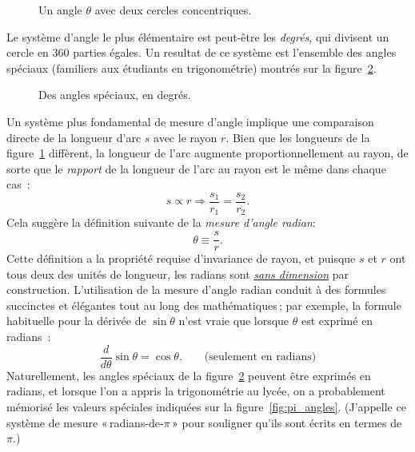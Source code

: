 \begin{figure}
\begin{center}
\end{center}
\caption{Un angle $\theta$ avec deux cercles
concentriques.\label{fig:angle_arclength}}
\end{figure}

Le système d'angle le plus élémentaire est peut-être les \emph{degrés}, qui
divisent un cercle en 360 parties égales. Un resultat de ce système est
l'ensemble des angles spéciaux (familiers aux étudiants en trigonométrie)
montrés sur la figure~\ref{fig:degree_angles}.

\begin{figure}
\begin{center}
\end{center}
\caption{Des angles spéciaux, en degrés.\label{fig:degree_angles}}
\end{figure}

Un système plus fondamental de mesure d'angle implique une comparaison directe
de la longueur d'arc $s$ avec le rayon $r$. Bien que les longueurs de la
figure~\ref{fig:angle_arclength} diffèrent, la longueur de l'arc augmente
proportionnellement au rayon, de sorte que le \emph{rapport} de la longueur de
l'arc au rayon est le même dans chaque cas~:
\[
s\propto r \Rightarrow \frac{s_1}{r_1} = \frac{s_2}{r_2}.
\]
Cela suggère la définition suivante de la \emph{mesure d'angle radian}:
\begin{equation}
\label{eq:radians}
\theta \equiv \frac{s}{r}.
\end{equation}
Cette définition a la propriété requise d'invariance de rayon, et puisque $s$ et
$r$ ont tous deux des unités de longueur, les radians sont
\href{https://fr.wikipedia.org/wiki/Grandeur_sans_dimension}{\emph{sans
dimension}} par construction. L'utilisation de la mesure d'angle radian conduit
à des formules succinctes et élégantes tout au long des mathématiques\,; par
exemple, la formule habituelle pour la dérivée de $\sin\theta$ n'est vraie que
lorsque $\theta$ est exprimé en radians~:
\[
  \frac{d}{d\theta}\sin\theta = \cos\theta. \qquad\mbox{(seulement en radians)}
\]
Naturellement, les angles spéciaux de la figure~\ref{fig:degree_angles} peuvent
être exprimés en radians, et lorsque l'on a appris la trigonométrie au lycée, on
a probablement mémorisé les valeurs spéciales indiquées sur la
figure~\ref{fig:pi_angles}. (J'appelle ce système de mesure
«\,radians-de-$\pi$\,» pour souligner qu'ils sont écrits en termes de $\pi$.)

